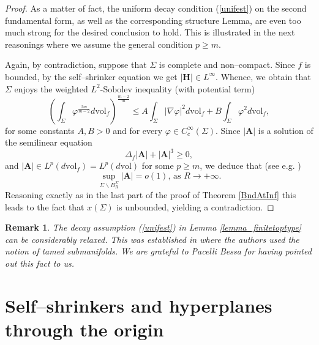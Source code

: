 \documentclass[11pt,leqno]{amsart}\usepackage{amsmath}
\newtheorem{remark}[theorem]{Remark}
\numberwithin{equation}{section}
\begin{document}
\begin{proof}
As a matter of fact, the uniform decay condition (\ref{unifest}) on the second fundamental form, as well as the corresponding structure Lemma,
are even too much strong for the desired conclusion to hold. This is illustrated in the next reasonings where we assume the general condition $p\geq m$.

Again, by contradiction, suppose that $\Sigma$ is complete and non--compact. Since $f$ is
bounded, by the self--shrinker equation we get $\left\vert \mathbf{H}\right\vert \in L^{\infty}$. Whence, we obtain that $\Sigma$ enjoys the weighted $L^{2}$-Sobolev inequality (with potential term)
\[
\left(  \int_{\Sigma}\varphi^{\frac{2m}{m-2}}d\mathrm{vol}_{f}\right)
^{\frac{m-2}{m}}\leq A\int_{\Sigma}\left\vert \nabla\varphi\right\vert
^{2}d\mathrm{vol}_{f}+B\int_{\Sigma}\varphi^{2}d\mathrm{vol}_{f},
\]
for some constants $A,B>0$ and for every $\varphi\in C_{c}^{\infty}\left(
\Sigma\right)  $. Since $\left\vert \mathbf{A}\right\vert $ is a solution of
the semilinear equation\[
\Delta_{f}\left\vert \mathbf{A}\right\vert +\left\vert \mathbf{A}\right\vert
^{3}\geq0,
\]
and $\left\vert \mathbf{A}\right\vert \in L^{p}\left(  d\mathrm{vol}_{f}\right)  =L^{p}\left(  d\mathrm{vol}\right)  $ for some $p\geq m$, we
deduce that (see e.g. \cite{PiVe-DGA})\begin{equation}
\sup_{\Sigma\backslash B_{R}^{\Sigma}}\left\vert \mathbf{A}\right\vert
=o\left(  1\right)  \text{, as }R\rightarrow+\infty.\label{unifest1}\end{equation}
Reasoning exactly as in the last part of the proof of Theorem \ref{BndAtInf} this leads to the fact that $x(\Sigma)$ is unbounded, yielding a contradiction.
\end{proof}

\begin{remark}\label{rem_tamed}
\rm{
The decay assumption (\ref{unifest}) in Lemma \ref{lemma_finitetoptype} can be considerably relaxed. This was established in \cite{BJM-CAG} where the authors used the notion of tamed submanifolds. We are grateful to Pacelli Bessa for having pointed out this fact to us.
}
\end{remark}


\section{Self--shrinkers and hyperplanes through the origin} \label{section halfspace}
\end{document}
